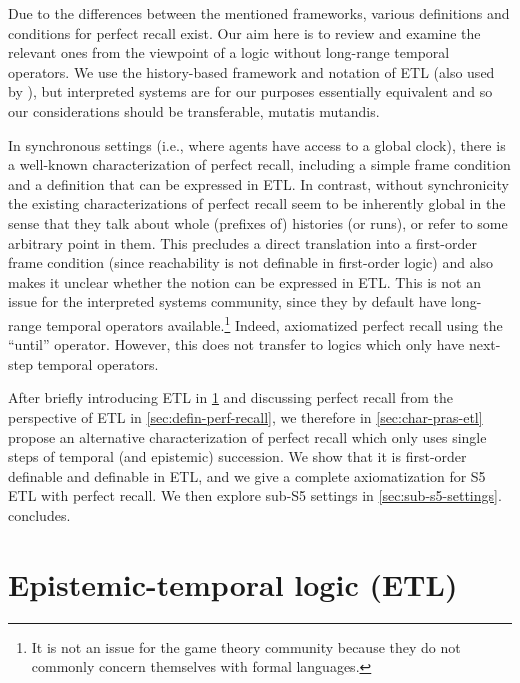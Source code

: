 \documentclass{article}
\newcounter{#1}
\begin{document}
Due to the differences between the mentioned frameworks,
various definitions and conditions for perfect recall exist.
Our aim here is to review and examine the relevant ones
from the viewpoint of a logic without long-range temporal operators.
We use the history-based framework and notation of ETL (also used by \citet{parikh_knowledge_2003}),
but interpreted systems are for our purposes essentially equivalent \cite{pacuit_comments_2007}
and so our considerations should be transferable, mutatis mutandis.

\medskip

In synchronous settings (i.e., where agents have access to a global clock),
there is a well-known characterization of perfect recall,
including a simple frame condition and a definition that can be expressed in ETL.
In contrast, without synchronicity the existing characterizations of perfect recall
seem to be inherently global in the sense that they talk about whole (prefixes of) histories (or runs),
or refer to some arbitrary point in them.
This precludes a direct translation into a first-order frame condition
(since reachability is not definable in first-order logic)
and also makes it unclear whether the notion can be expressed in ETL.
This is not an issue for the interpreted systems community,
since they by default have long-range temporal operators available.\footnote{It is not an issue for the game theory community because they do not commonly concern themselves with formal languages.}
Indeed, \citet{van_der_meyden_axioms_1993} axiomatized perfect recall using the ``until'' operator.
However, this does not transfer to logics which only have next-step temporal operators.

\medskip

After briefly introducing ETL in \cref{sec:epist-temp-logic}
and discussing perfect recall from the perspective of ETL in \cref{sec:defin-perf-recall},
we therefore in \cref{sec:char-pras-etl} propose an alternative characterization of perfect recall
which only uses single steps of temporal (and epistemic) succession.
We show that it is first-order definable and definable in ETL,
and we give a complete axiomatization for S5 ETL with perfect recall.
We then explore sub-S5 settings in \cref{sec:sub-s5-settings}.
 concludes.


\section{Epistemic-temporal logic (ETL)}
\label{sec:epist-temp-logic}
\end{document}
